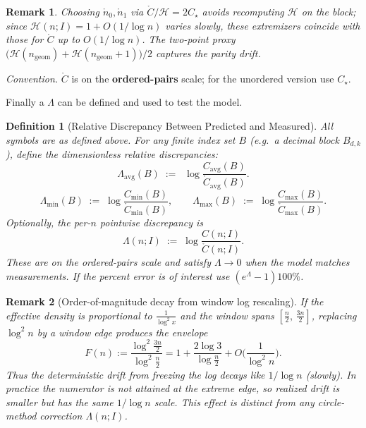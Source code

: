 \documentclass[11pt]{article}
\theoremstyle{inline}
\newtheorem*{remark}{Remark}
\theoremstyle{break}
\theoremstyle{break}
\theoremstyle{break}
\theoremstyle{break}
\theoremstyle{break}
\theoremstyle{break}
\theoremstyle{break}
\newtheorem{definition}{Definition}
\theoremstyle{inline}
\newcommand{\tavg}{{\scriptscriptstyle\mathrm{avg}}}
\newcommand{\Cmeas}{C}              %
\newcommand{\Cpred}{\mathring{C}}   %
\newcommand{\Npred}{\mathring{n}}   %
\newcommand{\Ngeom}{n_\mathrm{geom}}
\newcommand{\HLCorr}{\mathcal{H}}
\begin{document}
\begin{remark}
Choosing \(\Npred_0,\Npred_1\) via \(\Cpred/\HLCorr = 2C_\star\) avoids recomputing \(\HLCorr\) on the block; since
\(\HLCorr(n;I)=1+O(1/\log n)\) varies slowly, these extremizers coincide with those for \(\Cpred\) up to \(O(1/\log n)\).
The two-point proxy \(\big(\HLCorr(\Ngeom)+\HLCorr(\Ngeom+1)\big)/2\) captures the parity drift.
\end{remark}

\noindent\emph{Convention.} \(\Cpred\) is on the \textbf{ordered-pairs} scale; for the unordered version use \(C_\star\).

Finally a \( \Lambda \) can be defined and used to test the model.

\begin{definition}[Relative Discrepancy Between Predicted and Measured]
\label{def:lambda}
All symbols are as defined above. For any finite index set \(B\) (e.g.\ a decimal block \(B_{d,k}\)),
define the dimensionless relative discrepancies:
\begin{equation}
\Lambda_{\tavg}(B)\;:=\;\;\log{\frac{\Cmeas_{\tavg}(B)}{\Cpred_{\tavg}(B)}}.
\end{equation}
\begin{equation}
\Lambda_{\min}(B)\;:=\;\log{\frac{\Cmeas_{\min}(B)}{\Cpred_{\min}(B)}},
\qquad
\Lambda_{\max}(B)\;:=\;\log{\frac{\Cmeas_{\max}(B)}{\Cpred_{\max}(B)}}.
\end{equation}
Optionally, the per-\(n\) pointwise discrepancy is
\begin{equation}
\Lambda(n;I)\;:=\;\log{\frac{\Cmeas(n;I)}{\Cpred(n;I)}}.
\end{equation}
These are on the ordered-pairs scale and satisfy \(\Lambda\to 0\) when the model matches measurements.
If the percent error is of interest use \( \left( e^{\Lambda} - 1 \right) 100\% \).
\end{definition}

\begin{remark}[Order-of-magnitude decay from window log rescaling]
If the effective density is proportional to \(\frac{1}{\log^2{x}}\) and the window spans
\(\left[\frac{n}{2},\,\frac{3n}{2}\right]\), replacing \(\log^2 n\) by a window edge produces the envelope
\begin{equation}
F(n):=\frac{\log^2{\frac{3n}{2}}}{\log^2{\frac{n}{2}}}
=1+\frac{2\log 3}{\log{\frac{n}{2}}}+O\!\Big(\frac{1}{\log^2 n}\Big).
\end{equation}
Thus the deterministic drift from freezing the log decays like \(1/\log n\) (slowly).
In practice the numerator is not attained at the extreme edge, so realized drift
is smaller but has the same \(1/\log n\) scale. This effect is distinct from any
circle-method correction \(\Lambda(n;I)\).
\end{remark}
\end{document}
